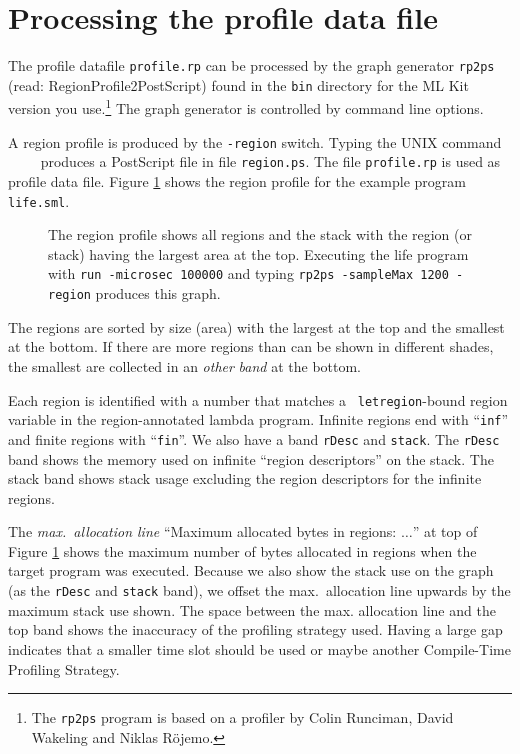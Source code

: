 \documentclass[12pt]{book}
\begin{document}
\section{Processing the profile data file}
The profile datafile \texttt{profile.rp} can be processed by the 
%
graph generator \texttt{rp2ps} (read: RegionProfile2PostScript) found
in the \texttt{bin} directory for the ML Kit version you
use.\footnote{The \texttt{rp2ps} program is based on a profiler by
  Colin Runciman, David Wakeling and Niklas R\"{o}jemo.} The graph
generator is controlled by command line options.

A region profile is produced by the
\texttt{-region} switch. Typing
the UNIX command ~~~~ produces a PostScript file in
file \texttt{region.ps}. The file \texttt{profile.rp} is used as 
%
profile data file. Figure \ref{prof_eks1.fig} shows the region profile
for the example program \texttt{life.sml}.
\begin{figure}[htb]
\begin{center}
  \caption{The region profile shows all
          regions and the stack with the region (or stack) having the
          largest area at the top. Executing the life program with
          \texttt{run -microsec 100000} and typing \texttt{rp2ps
            -sampleMax 1200 -region} produces this graph.}\label{prof_eks1.fig}
\end{center}
\end{figure}
The regions are sorted by size (area) with the largest at the top and the
smallest at the bottom. If there are more regions than can be shown in
different shades, the smallest are collected in an {\em other\/}
\emph{band} at the bottom.

Each region is identified with a number that matches a {\tt
  letregion}-bound region variable in the region-annotated lambda
program. Infinite regions end with ``{\tt inf}'' and finite regions
with ``{\tt fin}''. We also have a band \texttt{rDesc} and
\texttt{stack}. The \texttt{rDesc} band shows the memory used on
infinite ``region descriptors'' on the stack. The stack band shows
stack usage excluding the region descriptors for the infinite regions.

The \emph{max.\ allocation line} ``Maximum allocated bytes in regions:
$\ldots$'' at top of Figure \ref{prof_eks1.fig} shows the maximum number of
bytes allocated in regions when the target program was executed. Because we
also show the stack use on the graph (as the {\tt rDesc} and {\tt stack} band), we
offset the max.\ allocation line upwards by the maximum stack use shown. The
space between the max. allocation line and the top band shows the
inaccuracy of the profiling strategy used. Having a large gap indicates
that a smaller time slot should be used or maybe another Compile-Time Profiling
Strategy.
\end{document}
